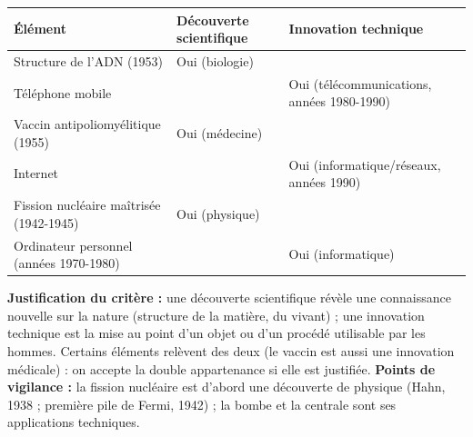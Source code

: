 \documentclass[11pt]{article}
\newcommand{\cle}[1]{{\popxbold\color{popdark}#1}}
\begin{document}
\begin{corrige}
\begin{center}
\begin{tabularx}{\linewidth}{|l|X|X|}
\hline
\rowcolor{popblueL} \textbf{Élément} & \textbf{Découverte scientifique} & \textbf{Innovation technique} \\
\hline
Structure de l'ADN (1953) & Oui (biologie) & \\
\hline
Téléphone mobile & & Oui (télécommunications, années 1980-1990) \\
\hline
Vaccin antipoliomyélitique (1955) & Oui (médecine) & \\
\hline
Internet & & Oui (informatique/réseaux, années 1990) \\
\hline
Fission nucléaire maîtrisée (1942-1945) & Oui (physique) & \\
\hline
Ordinateur personnel (années 1970-1980) & & Oui (informatique) \\
\hline
\end{tabularx}
\end{center}
\textbf{Justification du critère :} une \cle{découverte scientifique} révèle une connaissance nouvelle sur la nature (structure de la matière, du vivant) ; une \cle{innovation technique} est la mise au point d'un objet ou d'un procédé utilisable par les hommes. Certains éléments relèvent des deux (le vaccin est aussi une innovation médicale) : on accepte la double appartenance si elle est justifiée.
\textbf{Points de vigilance :} la fission nucléaire est d'abord une découverte de physique (Hahn, 1938 ; première pile de Fermi, 1942) ; la bombe et la centrale sont ses applications techniques.
\end{corrige}
\end{document}
